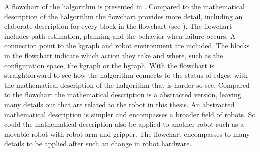 A flowchart of the \ac{halgorithm} is presented in . Compared to the mathematical description of the \ac{halgorithm} the flowchart provides more detail, including an elaborate description for every block in the flowchart (see ). The flowchart includes path estimation, planning and the behavior when failure occurs. A connection point to the \ac{kgraph} and robot environment are included. The blocks in the flowchart indicate which action they take and where, such as the configuration space, the \ac{kgraph} or the \ac{hgraph}. 
With the flowchart is straightforward to see how the \ac{halgorithm} connects to the status of edges, with the mathematical description of the \ac{halgorithm} that is harder so see. Compared to the flowchart the mathematical description is a abstracted version, leaving many details out that are related to the robot in this thesis. An abstracted mathematical description is simpler and encompasses a broader field of robots. So could the mathematical description also be applied to another robot such as a movable robot with robot arm and gripper. The flowchart encompasses to many details to be applied after such an change in robot hardware.



